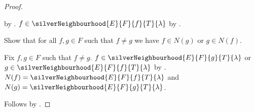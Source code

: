 \begin{proof}
\begin{subproof}
            by .
        $f\in\silverNeighbourhood{E}{F}{f}{T}{\lambda}$
            by .
    \end{subproof}
    Show that for all $f,g\in F$ such that $f\neq g$ we have
        $f\in N(g)$ or $g\in N(f)$.
    \begin{subproof}
        Fix $f,g\in F$ such that $f\neq g$.
        $f\in\silverNeighbourhood{E}{F}{g}{T}{\lambda}$ or
            $g\in\silverNeighbourhood{E}{F}{f}{T}{\lambda}$
            by .
        $N(f)=\silverNeighbourhood{E}{F}{f}{T}{\lambda}$ and
            $N(g)=\silverNeighbourhood{E}{F}{g}{T}{\lambda}$.
    \end{subproof}
    Follows by .
\end{proof}
